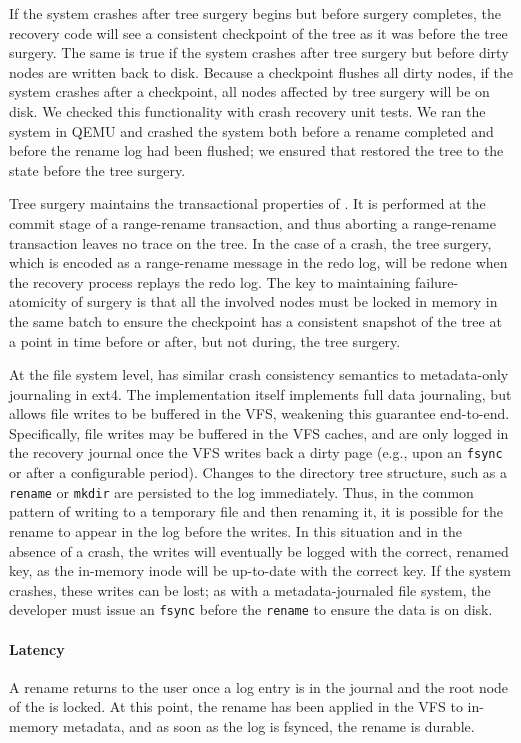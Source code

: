 If the system crashes after tree surgery begins but before surgery completes,
the recovery code will see a consistent checkpoint of the tree as it was
before the tree surgery.
The same is true if the system crashes after tree surgery but before dirty nodes
are written back to disk.
Because a checkpoint flushes all dirty nodes, if the system crashes after a
checkpoint, all nodes affected by tree surgery will be on disk.
We checked this functionality with crash recovery unit tests.
We ran the system in QEMU and crashed the system both before a rename completed
and before the rename log had been flushed;
we ensured that \betrfs restored the tree to the state before the tree surgery.

Tree surgery maintains the transactional properties of \betrfs.
It is performed at the commit stage of a range-rename transaction,
and thus aborting a range-rename transaction leaves no trace on the tree.
In the case of a crash, the tree surgery, which is encoded as a range-rename
message in the redo log, will be redone when the recovery process replays the
redo log.
The key to maintaining failure-atomicity of surgery is that all the involved
nodes must be locked in memory in the same batch to ensure the checkpoint has
a consistent snapshot of the tree at a point in time before or after,
but not during, the tree surgery.

At the file system level, \betrfs has similar crash consistency semantics to
metadata-only journaling in ext4.
The \bet implementation itself implements full data journaling, but \betrfs
allows file writes to be buffered in the VFS, weakening this guarantee
end-to-end.
Specifically, file writes may be buffered in the VFS caches, and are only logged
in the recovery journal once the VFS writes back a dirty page (e.g., upon an
{\tt fsync} or after a configurable period).
Changes to the directory tree structure, such as a {\tt rename} or {\tt mkdir}
are persisted to the log immediately.
Thus, in the common pattern of writing to a temporary file and then renaming it,
it is possible for the rename to appear in the log before the writes.
In this situation and in the absence of a crash, the writes will eventually be
logged with the correct, renamed key, as the in-memory inode will be up-to-date
with the correct \bet key.
If the system crashes, these writes can be lost; as with a metadata-journaled
file system, the developer must issue an {\tt fsync} before the {\tt rename} to
ensure the data is on disk.

\paragraph{Latency} A rename returns to the user once a log entry is in the
journal and the root node of the \bet is locked.
At this point, the rename has been applied in the VFS to in-memory metadata,
and as soon as the log is fsynced, the rename is durable.

